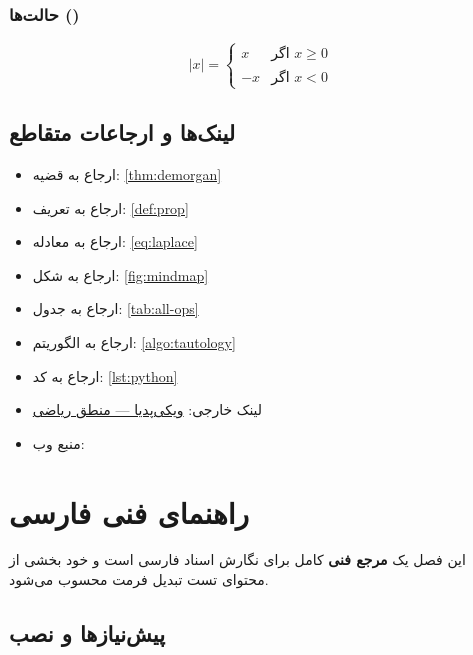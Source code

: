 \documentclass[12pt,a4paper,twoside]{book}
\begin{document}
\subsection{حالت‌ها ()}

\begin{equation}
  |x| =
  \begin{cases}
    x  & \text{اگر } x \geq 0 \\
    -x & \text{اگر } x < 0
  \end{cases}
  \label{eq:cases}
\end{equation}

\section{لینک‌ها و ارجاعات متقاطع}

\begin{itemize}[itemsep=4pt]
  \item ارجاع به قضیه: \cref{thm:demorgan}
  \item ارجاع به تعریف: \cref{def:prop}
  \item ارجاع به معادله: \cref{eq:laplace}
  \item ارجاع به شکل: \cref{fig:mindmap}
  \item ارجاع به جدول: \cref{tab:all-ops}
  \item ارجاع به الگوریتم: \cref{algo:tautology}
  \item ارجاع به کد: \cref{lst:python}
  \item لینک خارجی: \href{https://en.wikipedia.org/wiki/Mathematical_logic}{ویکی‌پدیا — منطق ریاضی}
  \item منبع وب: \cite{mdnweb2024}
\end{itemize}

\chapter{راهنمای فنی \lr{\LaTeX} فارسی}
\label{chap:guide}

\begin{warningbox}
  این فصل یک \textbf{مرجع فنی} کامل برای نگارش
  اسناد \lr{\LaTeX} فارسی است و خود بخشی از محتوای
  تست تبدیل فرمت محسوب می‌شود.
\end{warningbox}

\section{پیش‌نیازها و نصب}
\end{document}
